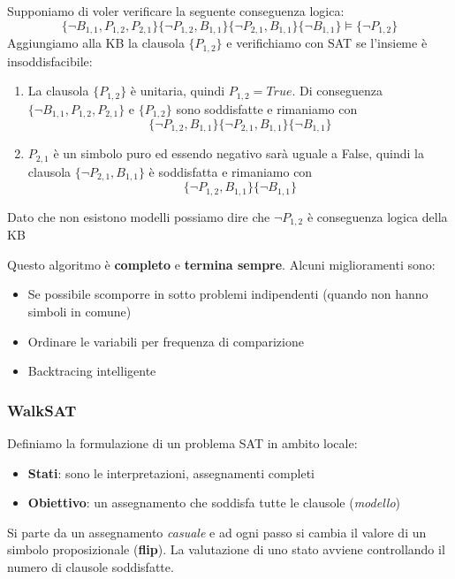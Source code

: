\begin{example}
	Supponiamo di voler verificare la seguente conseguenza logica:
	\begin{equation*}
		\{\neg B_{1,1}, P_{1,2}, P_{2,1}\}\{\neg P_{1,2}, B_{1,1}\}\{\neg P_{2,1}, B_{1,1}\}\{\neg B_{1,1}\} \models \{\neg P_{1,2}\}
	\end{equation*}
	Aggiungiamo alla KB la clausola $\{P_{1,2}\}$ e verifichiamo con SAT se l'insieme è insoddisfacibile:
	\begin{enumerate}
		\item La clausola $\{P_{1,2}\}$ è unitaria, quindi $P_{1,2}=True$. Di conseguenza $\{\neg B_{1,1}, P_{1,2}, P_{2,1}\}$ e $\{P_{1,2}\}$ sono soddisfatte e rimaniamo con
		\begin{equation*}
			\{\neg P_{1,2}, B_{1,1}\}\{\neg P_{2,1}, B_{1,1}\}\{\neg B_{1,1}\}
		\end{equation*}
		\item $P_{2,1}$ è un simbolo puro ed essendo negativo sarà uguale a False, quindi la clausola $\{\neg P_{2,1}, B_{1,1}\}$ è soddisfatta e rimaniamo con
		\begin{equation*}
			\{\neg P_{1,2}, B_{1,1}\}\{\neg B_{1,1}\}
		\end{equation*}
	\end{enumerate}
	Dato che non esistono modelli possiamo dire che $\neg P_{1,2}$ è conseguenza logica della KB
\end{example}
\noindent Questo algoritmo è \textbf{completo} e \textbf{termina sempre}. Alcuni miglioramenti sono:
\begin{itemize}
	\item Se possibile scomporre in sotto problemi indipendenti (quando non hanno simboli in comune)
	\item Ordinare le variabili per frequenza di comparizione
	\item Backtracing intelligente
\end{itemize}

\subsubsection{WalkSAT}
\label{alg:walksat}
Definiamo la formulazione di un problema SAT in ambito locale:
\begin{itemize}
	\item \textbf{Stati}: sono le interpretazioni, assegnamenti completi
	\item \textbf{Obiettivo}: un assegnamento che soddisfa tutte le clausole (\textit{modello})
\end{itemize}
Si parte da un assegnamento \textit{casuale} e ad ogni passo si cambia il valore di un simbolo proposizionale (\textbf{flip}). La valutazione di uno stato avviene controllando il numero di clausole soddisfatte.

